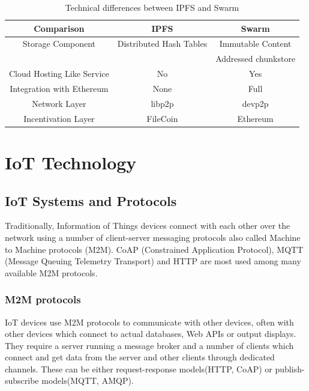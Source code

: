 \documentclass[11pt,openright]{report}
\begin{document}
\newline
\begin{table}[!htbp]
	\renewcommand{\arraystretch}{1.3}
	\caption{Technical differences between IPFS and Swarm}
	\label{swarm_ipfs_technical}
	\centering
	\begin{tabular}{|c||c|c|}
		\hline
		\bfseries Comparison & \bfseries IPFS & \bfseries Swarm \\
		\hline\hline
		Storage Component & Distributed Hash Tables & Immutable Content \\
		& & Addressed chunkstore \\ \hline
		Cloud Hosting Like Service & No & Yes  \\ \hline
		Integration with Ethereum & None & Full \\ \hline
		Network Layer & libp2p & devp2p \\ \hline
		Incentivation Layer & FileCoin & Ethereum \\ \hline
	\end{tabular}
\end{table}
\newline
\newline
\chapter{IoT Technology}
\label{chapter:iot_tech}
\section{IoT Systems and Protocols}
Traditionally, Information of Things devices connect with each other over the network using a number of client-server messaging protocols also called Machine to Machine protocols (M2M). CoAP (Constrained Application Protocol), MQTT (Message Queuing Telemetry Transport) and HTTP are most used among many available M2M protocols.

\subsection{M2M protocols}
IoT devices use M2M protocols to communicate with other devices, often with other devices which connect to actual databases, Web APIs or output displays. They require a server running a message broker and a number of clients which connect and get data from the server and other clients through dedicated channels. These can be either request-response models(HTTP, CoAP) or publish-subscribe models(MQTT, AMQP).
\end{document}
